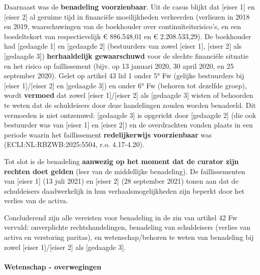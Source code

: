 \documentclass[
  dutch,
  a4paper,
]{article}
\begin{document}
Daarnaast was de \textbf{benadeling voorzienbaar}. Uit de casus blijkt dat {[}eiser 1{]} en {[}eiser 2{]} al geruime tijd in financiële moeilijkheden verkeerden (verliezen in 2018 en 2019, waarschuwingen van de boekhouder over continuïteitsrisico's, en een boedeltekort van respectievelijk € 886.548,01 en € 2.208.533,29). De boekhouder had {[}gedaagde 1{]} en {[}gedaagde 2{]} (bestuurders van zowel {[}eiser 1{]}, {[}eiser 2{]} als {[}gedaagde 3{]}) \textbf{herhaaldelijk gewaarschuwd} voor de slechte financiële situatie en het risico op faillissement (bijv. op 13 januari 2020, 30 april 2020, en 25 september 2020). Gelet op artikel 43 lid 1 onder 5° Fw (gelijke bestuurders bij {[}eiser 1{]}/{[}eiser 2{]} en {[}gedaagde 3{]}) en onder 6° Fw (behoren tot dezelfde groep), wordt \textbf{vermoed} dat zowel {[}eiser 1{]}/{[}eiser 2{]} als {[}gedaagde 3{]} wisten of behoorden te weten dat de schuldeisers door deze handelingen zouden worden benadeeld. Dit vermoeden is niet ontzenuwd: {[}gedaagde 3{]} is opgericht door {[}gedaagde 2{]} (die ook bestuurder was van {[}eiser 1{]} en {[}eiser 2{]}) en de overdrachten vonden plaats in een periode waarin het faillissement \textbf{redelijkerwijs voorzienbaar} was (ECLI:NL:RBZWB:2025:5504, r.o. 4.17-4.20).

Tot slot is de benadeling \textbf{aanwezig op het moment dat de curator zijn rechten doet gelden} (leer van de middellijke benadeling). De faillissementen van {[}eiser 1{]} (13 juli 2021) en {[}eiser 2{]} (28 september 2021) tonen aan dat de schuldeisers daadwerkelijk in hun verhaalsmogelijkheden zijn beperkt door het verlies van de activa.

Concluderend zijn alle vereisten voor benadeling in de zin van artikel 42 Fw vervuld: onverplichte rechtshandelingen, benadeling van schuldeisers (verlies van activa en verstoring paritas), en wetenschap/behoren te weten van benadeling bij zowel {[}eiser 1{]}/{[}eiser 2{]} als {[}gedaagde 3{]}.

\paragraph{Wetenschap - overwegingen}\label{wetenschap---overwegingen-21}
\end{document}
